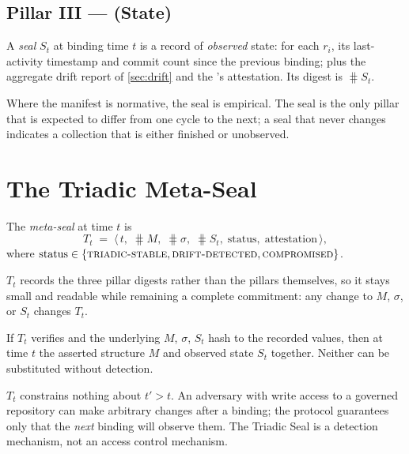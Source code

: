 \documentclass[11pt,a4paper]{article}
\begin{document}
\subsection{Pillar III --- \Seal{} (State)}

\begin{definition}[Seal]
\label{def:seal}
A \emph{seal} $S_t$ at binding time $t$ is a record of \emph{observed} state:
for each $r_i$, its last-activity timestamp and commit count since the
previous binding; plus the aggregate drift report of \cref{sec:drift} and the
\Operator{}'s attestation. Its digest is $\hash{S_t}$.
\end{definition}

Where the manifest is normative, the seal is empirical. The seal is the only
pillar that is expected to differ from one cycle to the next; a seal that
never changes indicates a collection that is either finished or unobserved.

\section{The Triadic Meta-Seal}
\label{sec:metaseal}

\begin{definition}
The \emph{meta-seal} at time $t$ is
\[
  T_t \;=\; \bigl\langle\, t,\; \hash{M},\; \hash{\sigma},\; \hash{S_t},\;
              \mathrm{status},\; \mathrm{attestation} \,\bigr\rangle ,
\]
where $\mathrm{status} \in \{\textsc{triadic-stable},
\textsc{drift-detected}, \textsc{compromised}\}$.
\end{definition}

$T_t$ records the three pillar digests rather than the pillars themselves, so
it stays small and readable while remaining a complete commitment: any change
to $M$, $\sigma$, or $S_t$ changes $T_t$.

\begin{property}[Binding]
If $T_t$ verifies and the underlying $M$, $\sigma$, $S_t$ hash to the
recorded values, then at time $t$ the \Operator{} asserted structure $M$ and
observed state $S_t$ together. Neither can be substituted without detection.
\end{property}

\begin{property}
\label{prop:nonprevention}
$T_t$ constrains nothing about $t' > t$. An adversary with write access to a
governed repository can make arbitrary changes after a binding; the protocol
guarantees only that the \emph{next} binding will observe them. The Triadic
Seal is a detection mechanism, not an access control mechanism.
\end{property}
\end{document}
